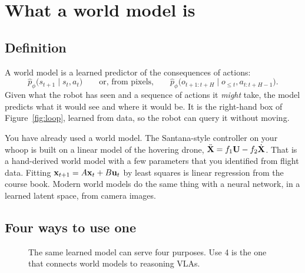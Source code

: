 \section{What a world model is}
\label{sec:wm}

\subsection{Definition}
A world model is a learned predictor of the consequences of actions:
\begin{equation}
\hat p_\phi\big(s_{t+1}\mid s_t,a_t\big)\qquad\text{or, from pixels,}\qquad \hat p_\phi\big(o_{t+1:t+H}\mid o_{\le t},a_{t:t+H-1}\big).
\end{equation}
Given what the robot has seen and a sequence of actions it \emph{might} take, the model predicts what it would see and where it would be. It is the right-hand box of Figure~\ref{fig:loop}, learned from data, so the robot can query it without moving.

\begin{bridgebox}
You have already used a world model. The Santana-style controller on your whoop is built on a linear model of the hovering drone, $\ddot{\mathbf{X}}=f_1\mathbf{U}-f_2\dot{\mathbf{X}}$. That is a hand-derived world model with a few parameters that you identified from flight data. Fitting $\mathbf{x}_{t+1}=A\mathbf{x}_t+B\mathbf{u}_t$ by least squares is linear regression from the course book. Modern world models do the same thing with a neural network, in a learned latent space, from camera images.
\end{bridgebox}

\subsection{Four ways to use one}
\begin{figure}[h]
\centering
{}
\caption{The same learned model can serve four purposes. Use 4 is the one that connects world models to reasoning VLAs.}
\label{fig:uses}
\end{figure}

